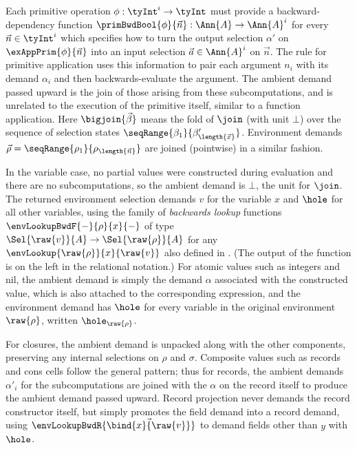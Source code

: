  Each primitive operation $\phi: \tyInt^{i} \to \tyInt$ must provide a backward-dependency  function $\primBwdBool{\phi}{\vec{n}}: \Ann{A} \to \Ann{A}^i$ for every $\vec{n} \in \tyInt^i$ which specifies how to turn the output selection $\alpha'$ on $\exAppPrim{\phi}{\vec{n}}$ into an input selection $\vec{a} \in \Ann{A}^i$ on $\vec{n}$. The rule for primitive application uses this information to pair each argument $n_i$ with its demand $\alpha_i$ and then backwards-evaluate the argument. The ambient demand passed upward is the join of those arising from these subcomputations, and is unrelated to the execution of the primitive itself, similar to a function application. Here $\bigjoin{\vec{\beta}}$ means the fold of $\join$ (with unit $\bot$) over the sequence of selection states $\seqRange{\beta_1}{\beta_{\length{\vec{x}}}'}$. Environment demands $\vec{\rho} = \seqRange{\rho_1}{\rho_{\length{\vec{n}}}}$ are joined (pointwise) in a similar fashion.

 In the variable case, no partial values were constructed during evaluation and there are no subcomputations, so the ambient demand is $\bot$, the unit for $\join$. The returned environment selection demands $v$ for the variable $x$ and $\hole$ for all other variables, using the family of \emph{backwards lookup} functions $\envLookupBwdF{-}{\rho}{x}{-}$ of type $\Sel{\raw{v}}{A} \to \Sel{\raw{\rho}}{A}$ for any $\envLookup{\raw{\rho}}{x}{\raw{v}}$ also defined in . (The output of the function is on the left in the relational notation.) For atomic values such as integers and nil, the ambient demand is simply the demand $\alpha$ associated with the constructed value, which is also attached to the corresponding expression, and the environment demand has $\hole$ for every variable in the original environment $\raw{\rho}$, written $\hole_{\raw{\rho}}$.

For closures, the ambient demand is unpacked along with the other components, preserving any internal selections on $\rho$ and $\sigma$. Composite values such as records and cons cells follow the general pattern; thus for records, the ambient demands $\alpha'_i$ for the subcomputations are joined with the $\alpha$ on the record itself to produce the ambient demand passed upward. Record projection never demands the record constructor itself, but simply promotes the field demand into a record demand, using $\envLookupBwdR{\vec{\bind{x}{\raw{v}}}}$ to demand fields other than $y$ with $\hole$.

